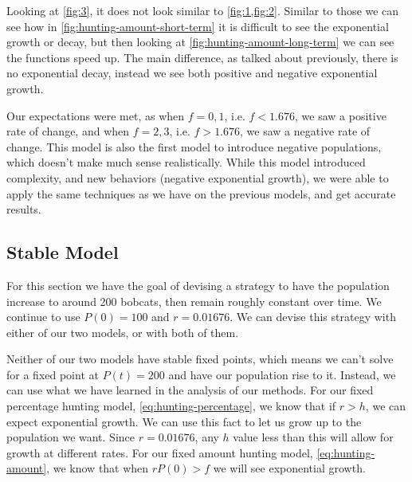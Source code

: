 \documentclass{article}
\begin{document}
Looking at \cref{fig:3}, it does not look similar to \cref{fig:1,fig:2}. Similar to those we can see how in \cref{fig:hunting-amount-short-term} it is difficult to see the exponential growth or decay, but then looking at \cref{fig:hunting-amount-long-term} we can see the functions speed up. The main difference, as talked about previously, there is no exponential decay, instead we see both positive and negative exponential growth.

Our expectations were met, as when $f=0,1$, i.e. $f < 1.676$, we saw a positive rate of change, and when $f=2,3$, i.e. $f > 1.676$, we saw a negative rate of change. This model is also the first model to introduce negative populations, which doesn't make much sense realistically. While this model introduced complexity, and new behaviors (negative exponential growth), we were able to apply the same techniques as we have on the previous models, and get accurate results.

\subsection{Stable Model}
For this section we have the goal of devising a strategy to have the population increase to around 200 bobcats, then remain roughly constant over time. We continue to use $P(0)=100$ and $r = 0.01676$. We can devise this strategy with either of our two models, or with both of them.

Neither of our two models have stable fixed points, which means we can't solve for a fixed point at $P(t)=200$ and have our population rise to it. Instead, we can use what we have learned in the analysis of our methods. For our fixed percentage hunting model, \cref{eq:hunting-percentage}, we know that if $r > h$, we can expect exponential growth. We can use this fact to let us grow up to the population we want. Since $r = 0.01676$, any $h$ value less than this will allow for growth at different rates. For our fixed amount hunting model, \cref{eq:hunting-amount}, we know that when $rP(0) > f$ we will see exponential growth.
\end{document}
